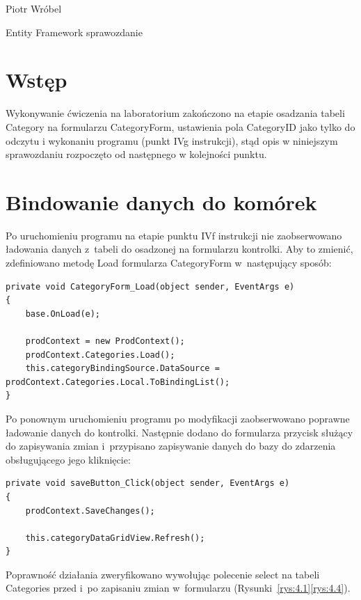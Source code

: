 \documentclass[12pt, a4paper]{mwart}
\begin{document}
\begin{center}
Piotr Wróbel

Entity Framework \ppauza sprawozdanie
\end{center}

\tableofcontents

\section{Wstęp}

Wykonywanie ćwiczenia na laboratorium zakończono na etapie osadzania tabeli Category na formularzu CategoryForm, ustawienia pola CategoryID jako tylko do odczytu i wykonaniu programu (punkt IVg instrukcji), stąd opis w niniejszym sprawozdaniu rozpoczęto od następnego w kolejności punktu.

\section{Bindowanie danych do komórek}

Po uruchomieniu programu na etapie punktu IVf instrukcji nie zaobserwowano ładowania danych z~tabeli do osadzonej na formularzu kontrolki. Aby to zmienić, zdefiniowano metodę Load formularza CategoryForm w~następujący sposób:

\begin{lstlisting}
private void CategoryForm_Load(object sender, EventArgs e)
{
	base.OnLoad(e);

	prodContext = new ProdContext();
	prodContext.Categories.Load();
	this.categoryBindingSource.DataSource = prodContext.Categories.Local.ToBindingList();
}
\end{lstlisting}

Po ponownym uruchomieniu programu po modyfikacji zaobserwowano poprawne ładowanie danych do kontrolki. Następnie dodano do formularza przycisk służący do zapisywania zmian i~przypisano zapisywanie danych do bazy do zdarzenia obsługującego jego kliknięcie:

\begin{lstlisting}
private void saveButton_Click(object sender, EventArgs e)
{
	prodContext.SaveChanges();

	this.categoryDataGridView.Refresh();
}
\end{lstlisting}

Poprawność działania zweryfikowano wywołując polecenie select na tabeli Categories przed i~po zapisaniu zmian w~formularzu (Rysunki~\ref{rys:4.1}\dywiz{}\ref{rys:4.4}).
\end{document}
